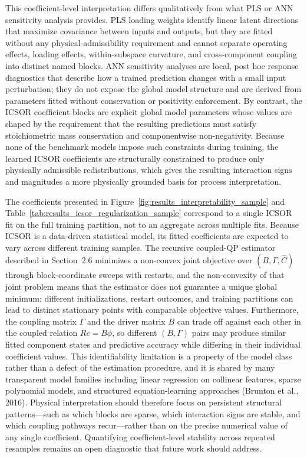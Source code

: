 \documentclass[a4paper,fleqn]{cas-sc}
\newcommand{\revitem}[2]{\textcolor{#1}{#2}}
\newenvironment{revblock}{\begingroup\color{revDefault}}{\endgroup}
\newenvironment{revblockr21}{\begingroup\color{revRtwoOne}}{\endgroup}
\begin{document}
\begin{revblock}
\begin{revblockr21}
\revitem{revRtwoOne}{This coefficient-level interpretation differs qualitatively from what PLS or ANN sensitivity analysis provides. PLS loading weights identify linear latent directions that maximize covariance between inputs and outputs, but they are fitted without any physical-admissibility requirement and cannot separate operating effects, loading effects, within-subspace curvature, and cross-component coupling into distinct named blocks. ANN sensitivity analyses are local, post hoc response diagnostics that describe how a trained prediction changes with a small input perturbation; they do not expose the global model structure and are derived from parameters fitted without conservation or positivity enforcement. By contrast, the ICSOR coefficient blocks are explicit global model parameters whose values are shaped by the requirement that the resulting predictions must satisfy stoichiometric mass conservation and componentwise non-negativity. Because none of the benchmark models impose such constraints during training, the learned ICSOR coefficients are structurally constrained to produce only physically admissible redistributions, which gives the resulting interaction signs and magnitudes a more physically grounded basis for process interpretation.}

\revitem{revRtwoFour}{The coefficients presented in Figure~\ref{fig:results_interpretability_sample} and Table~\ref{tab:results_icsor_regularization_sample} correspond to a single ICSOR fit on the full training partition, not to an aggregate across multiple fits. Because ICSOR is a data-driven statistical model, its fitted coefficients are expected to vary across different training samples. The recursive coupled-QP estimator described in Section~2.6 minimizes a non-convex joint objective over $(B, \Gamma, \widehat{C})$ through block-coordinate sweeps with restarts, and the non-convexity of that joint problem means that the estimator does not guarantee a unique global minimum: different initializations, restart outcomes, and training partitions can lead to distinct stationary points with comparable objective values. Furthermore, the coupling matrix $\Gamma$ and the driver matrix $B$ can trade off against each other in the coupled relation $Rc = B\phi$, so different $(B, \Gamma)$ pairs may produce similar fitted component states and predictive accuracy while differing in their individual coefficient values. This identifiability limitation is a property of the model class rather than a defect of the estimation procedure, and it is shared by many transparent model families including linear regression on collinear features, sparse polynomial models, and structured equation-learning approaches (Brunton et al., 2016). Physical interpretation should therefore focus on persistent structural patterns---such as which blocks are sparse, which interaction signs are stable, and which coupling pathways recur---rather than on the precise numerical value of any single coefficient. Quantifying coefficient-level stability across repeated resamples remains an open diagnostic that future work should address.}
\end{revblockr21}

\end{revblock}
\end{document}
